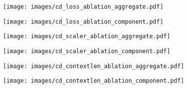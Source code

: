 \begin{figure*}[htbp]
    \vspace{1ex} %

    \begin{minipage}{0.48\textwidth}
        \centering
        \texttt{[image: images/cd\_loss\_ablation\_aggregate.pdf]}
        \label{fig:cd_loss_ablation_aggregate}
    \end{minipage}%
    \hfill
    \begin{minipage}{0.48\textwidth}
        \centering
        \texttt{[image: images/cd\_loss\_ablation\_component.pdf]}
        \label{fig:cd_loss_ablation_component}
    \end{minipage}

    \vspace{1ex} %

    \begin{minipage}{0.48\textwidth}
        \centering
        \texttt{[image: images/cd\_scaler\_ablation\_aggregate.pdf]}
        \label{fig:cd_scaler_ablation_aggregate}
    \end{minipage}%
    \hfill
    \begin{minipage}{0.48\textwidth}
        \centering
        \texttt{[image: images/cd\_scaler\_ablation\_component.pdf]}
        \label{fig:cd_scaler_ablation_component}
    \end{minipage}

    \vspace{1ex} %

    \begin{minipage}{0.48\textwidth}
        \centering
        \texttt{[image: images/cd\_contextlen\_ablation\_aggregate.pdf]}
        \label{fig:cd_contextlen_ablation_aggregate}
    \end{minipage}%
    \hfill
    \begin{minipage}{0.48\textwidth}
        \centering
        \texttt{[image: images/cd\_contextlen\_ablation\_component.pdf]}
        \label{fig:cd_contextlen_ablation_component}
    \end{minipage}


\end{figure*}
